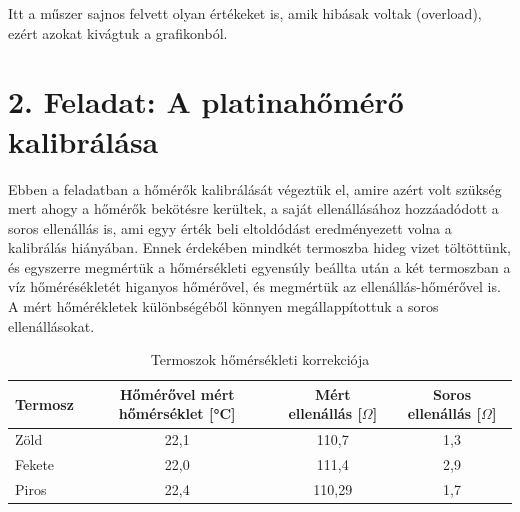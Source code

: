 \documentclass{article}
\begin{document}
Itt a műszer sajnos felvett olyan értékeket is, amik hibásak voltak (overload), ezért azokat kivágtuk a grafikonból.

\section*{2. Feladat: A platinahőmérő kalibrálása}

Ebben a feladatban a hőmérők kalibrálását végeztük el, amire azért volt szükség mert ahogy a hőmérők bekötésre kerültek, a saját ellenállásához hozzáadódott a soros ellenállás is, ami egyy érték beli eltoldódást eredményezett volna a kalibrálás hiányában. Ennek érdekében mindkét termoszba hideg vizet töltöttünk, és egyszerre megmértük a hőmérsékleti egyensúly beállta után a két termoszban a víz hőmérésékletét higanyos hőmérővel, és megmértük az ellenállás-hőmérővel is. A mért hőmérékletek különbségéből könnyen megállappítottuk a soros ellenállásokat.

\begin{table}[H]
    \centering
    \begin{tabular}{|l|c|c|c|}
        \hline
        Termosz & Hőmérővel mért hőmérséklet [°C] & Mért ellenállás [$\Omega$] & Soros ellenállás [$\Omega$] \\ \hline
        Zöld & 22,1 & 110,7 & 1,3 \\ \hline
        Fekete & 22,0 & 111,4 & 2,9 \\ \hline
        Piros & 22,4 & 110,29 & 1,7 \\ \hline
    \end{tabular}
    \caption{Termoszok hőmérsékleti korrekciója}
    \label{tab:hotan_2}
\end{table}

\end{document}
